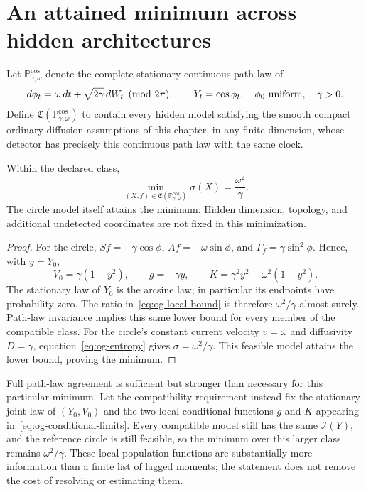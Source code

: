 \section{An attained minimum across hidden architectures}

Let $\mathbb P_{\gamma,\omega}^{\cos}$ denote the complete stationary
continuous path law of
\begin{equation}
 d\phi_t=\omega\,dt+\sqrt{2\gamma}\,dW_t\pmod{2\pi},\qquad
 Y_t=\cos\phi_t,
 \quad \phi_0\ \hbox{uniform},\quad \gamma>0.
 \label{eq:og-circle}
\end{equation}
Define $\mathfrak C(\mathbb P_{\gamma,\omega}^{\cos})$ to contain every
hidden model satisfying the smooth compact ordinary-diffusion assumptions of
this chapter, in any finite dimension, whose detector has precisely this
continuous path law with the same clock.

\begin{theorem}
\label{thm:og-circle-minimum}
Within the declared class,
\begin{equation}
 \boxed{\displaystyle
 \min_{(X,f)\in\mathfrak C(\mathbb P_{\gamma,\omega}^{\cos})}
       \sigma(X)=\frac{\omega^2}{\gamma}.}
 \label{eq:og-circle-min}
\end{equation}
The circle model itself attains the minimum. Hidden dimension, topology,
and additional undetected coordinates are not fixed in this minimization.
\end{theorem}

\begin{proof}
For the circle, $Sf=-\gamma\cos\phi$, $Af=-\omega\sin\phi$, and
$\Gamma_f=\gamma\sin^2\phi$. Hence, with $y=Y_0$,
\[
 V_0=\gamma(1-y^2),\qquad
 g=-\gamma y,\qquad
 K=\gamma^2y^2-\omega^2(1-y^2).
\]
The stationary law of $Y_0$ is the arcsine law; in particular its endpoints
have probability zero. The ratio in~\eqref{eq:og-local-bound} is therefore
$\omega^2/\gamma$ almost surely. Path-law invariance implies this same
lower bound for every member of the compatible class. For the circle's
constant current velocity $v=\omega$ and diffusivity $D=\gamma$,
equation~\eqref{eq:og-entropy} gives $\sigma=\omega^2/\gamma$.
This feasible model attains the lower bound, proving the minimum.
\end{proof}

Full path-law agreement is sufficient but stronger than necessary for this
particular minimum. Let the compatibility requirement instead fix the
stationary joint law of $(Y_0,V_0)$ and the two local conditional functions
$g$ and $K$ appearing in~\eqref{eq:og-conditional-limits}. Every compatible
model still has the same $\mathcal I(Y)$, and the reference circle is still
feasible, so the minimum over this larger class remains
$\omega^2/\gamma$. These local population functions are substantially more
information than a finite list of lagged moments; the statement does not
remove the cost of resolving or estimating them.

